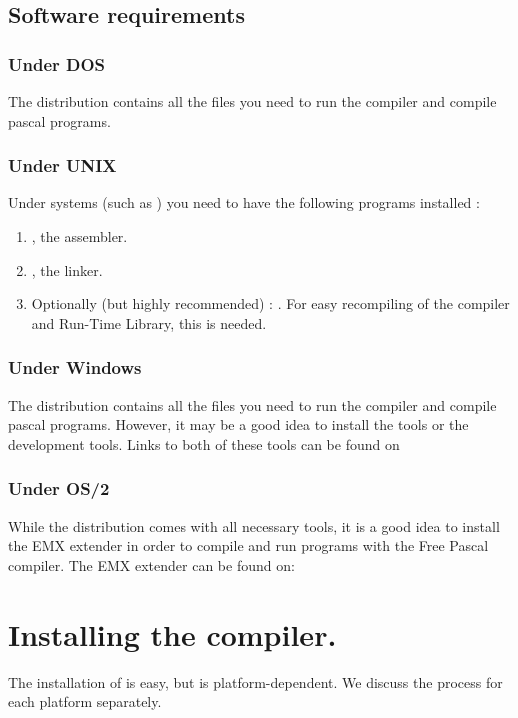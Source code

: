 \subsection{Software requirements}

\subsubsection{Under DOS}
The \dos distribution contains all the files you need to run the compiler
and compile pascal programs.

\subsubsection{Under UNIX}
Under \unix systems (such as \linux) you need to have the following programs 
installed :
\begin{enumerate}
\item \gnu {}, the \gnu assembler.
\item \gnu {}, the \gnu linker.
\item Optionally (but highly recommended) : \gnu {}. For easy
recompiling of the compiler and Run-Time Library, this is needed.
\end{enumerate}

\subsubsection{Under Windows}
The \windows distribution contains all the files you need to run the compiler
and compile pascal programs. However, it may be a good idea to install
the  tools or the  development tools. Links
to both of these tools can be found on 

\subsubsection{Under OS/2}
While the \fpc distribution comes with all necessary tools, it is a good
idea to install the EMX extender in order to compile and run
programs with the Free Pascal compiler. The EMX extender can be found on:\\

\section{Installing the compiler.}
The installation of \fpc is easy, but is platform-dependent.
We discuss the process for each platform separately.

